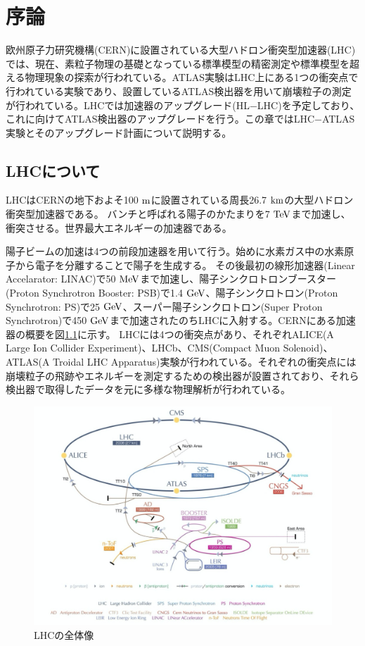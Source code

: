\chapter{序論}
欧州原子力研究機構(CERN)に設置されている大型ハドロン衝突型加速器(LHC)では、現在、素粒子物理の基礎となっている標準模型の精密測定や標準模型を超える物理現象の探索が行われている。ATLAS実験はLHC上にある1つの衝突点で行われている実験であり、設置しているATLAS検出器を用いて崩壊粒子の測定が行われている。LHCでは加速器のアップグレード(HL$-$LHC)を予定しており、これに向けてATLAS検出器のアップグレードを行う。この章ではLHC$-$ATLAS実験とそのアップグレード計画について説明する。

\section{LHCについて}
LHCはCERNの地下およそ100 $\rm{m}$に設置されている周長26.7 $\rm{km}$の大型ハドロン衝突型加速器である。
バンチと呼ばれる陽子のかたまりを7 $\rm{TeV}$まで加速し、衝突させる。世界最大エネルギーの加速器である。

陽子ビームの加速は4つの前段加速器を用いて行う。始めに水素ガス中の水素原子から電子を分離することで陽子を生成する。
その後最初の線形加速器(Linear Accelarator: LINAC)で50 $\rm{MeV}$まで加速し、陽子シンクロトロンブースター(Proton Synchrotron Booster: PSB)で1.4 $\rm{GeV}$、陽子シンクロトロン(Proton Synchrotron: PS)で25 $\rm{GeV}$、スーパー陽子シンクロトロン(Super Proton Synchrotron)で450 $\rm{GeV}$まで加速されたのちLHCに入射する。CERNにある加速器の概要を図\ref{LHC_overview}に示す。
LHCには4つの衝突点があり、それぞれALICE(A Large Ion Collider Experiment)、LHCb、CMS(Compact Muon Solenoid)、ATLAS(A
Troidal LHC Apparatus)実験が行われている。それぞれの衝突点には崩壊粒子の飛跡やエネルギーを測定するための検出器が設置されており、それら検出器で取得したデータを元に多様な物理解析が行われている。

\begin{figure}[bpt]\centering
\includegraphics[width=12cm]{LHC_overview}
\caption[LHCの全体像]{LHCの全体像\cite{1-1}}
\label{LHC_overview}
\end{figure}

